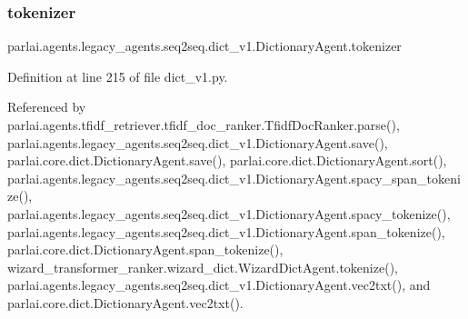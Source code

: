 \mbox{\label{classparlai_1_1agents_1_1legacy__agents_1_1seq2seq_1_1dict__v1_1_1DictionaryAgent_a7af7face69518cf70f6fb4dabae8b68f}} 
\subsubsection{\texorpdfstring{tokenizer}{tokenizer}}
{\footnotesize\ttfamily parlai.\+agents.\+legacy\+\_\+agents.\+seq2seq.\+dict\+\_\+v1.\+Dictionary\+Agent.\+tokenizer}



Definition at line 215 of file dict\+\_\+v1.\+py.



Referenced by parlai.\+agents.\+tfidf\+\_\+retriever.\+tfidf\+\_\+doc\+\_\+ranker.\+Tfidf\+Doc\+Ranker.\+parse(), parlai.\+agents.\+legacy\+\_\+agents.\+seq2seq.\+dict\+\_\+v1.\+Dictionary\+Agent.\+save(), parlai.\+core.\+dict.\+Dictionary\+Agent.\+save(), parlai.\+core.\+dict.\+Dictionary\+Agent.\+sort(), parlai.\+agents.\+legacy\+\_\+agents.\+seq2seq.\+dict\+\_\+v1.\+Dictionary\+Agent.\+spacy\+\_\+span\+\_\+tokenize(), parlai.\+agents.\+legacy\+\_\+agents.\+seq2seq.\+dict\+\_\+v1.\+Dictionary\+Agent.\+spacy\+\_\+tokenize(), parlai.\+agents.\+legacy\+\_\+agents.\+seq2seq.\+dict\+\_\+v1.\+Dictionary\+Agent.\+span\+\_\+tokenize(), parlai.\+core.\+dict.\+Dictionary\+Agent.\+span\+\_\+tokenize(), wizard\+\_\+transformer\+\_\+ranker.\+wizard\+\_\+dict.\+Wizard\+Dict\+Agent.\+tokenize(), parlai.\+agents.\+legacy\+\_\+agents.\+seq2seq.\+dict\+\_\+v1.\+Dictionary\+Agent.\+vec2txt(), and parlai.\+core.\+dict.\+Dictionary\+Agent.\+vec2txt().

\mbox{\label{classparlai_1_1agents_1_1legacy__agents_1_1seq2seq_1_1dict__v1_1_1DictionaryAgent_ab58513a40d311f0ba6f2f4139fcc6ef2}} 
